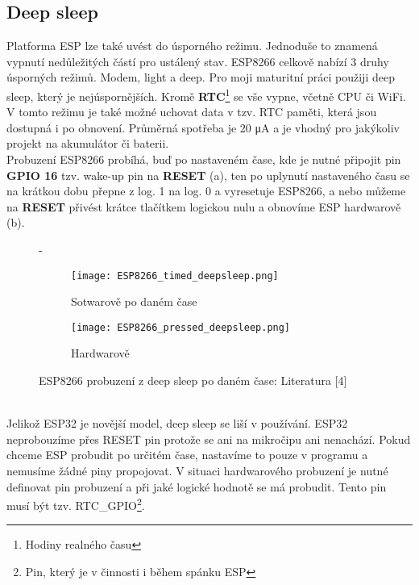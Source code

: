 \documentclass[a4paper, 12pt]{report}
\begin{document}
				\subsection{Deep sleep} \label{subsub:Deep sleep}
					Platforma ESP lze také uvést do úsporného režimu. Jednoduše to znamená vypnutí nedůležitých částí pro ustálený stav. ESP8266 celkově nabízí 3 druhy úsporných režimů. Modem, light a deep. Pro moji maturitní práci použiji deep sleep, který je nejúspornějších. Kromě {\bf RTC}\footnote{Hodiny realného času} se vše vypne, včetně CPU či WiFi. V tomto režimu je také možné uchovat data v tzv. RTC paměti, která jsou dostupná i po obnovení. Průměrná spotřeba je 20 \si{\micro A} a je vhodný pro jakýkoliv projekt na akumulátor či baterii. \\
					Probuzení ESP8266 probíhá, buď po nastaveném čase, kde je nutné připojit pin {\bf GPIO 16} tzv. wake-up pin na {\bf RESET} (a), ten po uplynutí nastaveného času se na krátkou dobu přepne z log. 1 na log. 0 a vyresetuje ESP8266, a nebo můžeme na {\bf RESET} přivést krátce tlačítkem logickou nulu a obnovíme ESP hardwarově (b).
					\begin{figure}[h!]
					  \centering-
					  \begin{subfigure}[b]{0.4\linewidth}
					    \texttt{[image: ESP8266\_timed\_deepsleep.png]}
					    \caption{Sotwarově po daném čase}
					  \end{subfigure}
					  \begin{subfigure}[b]{0.4\linewidth}
					    \texttt{[image: ESP8266\_pressed\_deepsleep.png]}
					    \caption{Hardwarově}
					  \end{subfigure}
					  \caption{ESP8266 probuzení z deep sleep po daném čase: Literatura [4]}
					  \label{ESP8266_timed_pressed_deepsleep}
					\end{figure}\\
					Jelikož ESP32 je novější model, deep sleep se liší v používání. ESP32 neprobouzíme přes RESET pin protože se ani na mikročipu ani nenachází. Pokud chceme ESP probudit po určitém čase, nastavíme to pouze v programu a nemusíme žádné piny propojovat. V situaci hardwarového probuzení je nutné definovat pin probuzení a při jaké logické hodnotě se má probudit. Tento pin musí být tzv. RTC\_GPIO\footnote{Pin, který je v činnosti i během spánku ESP}.
\end{document}
